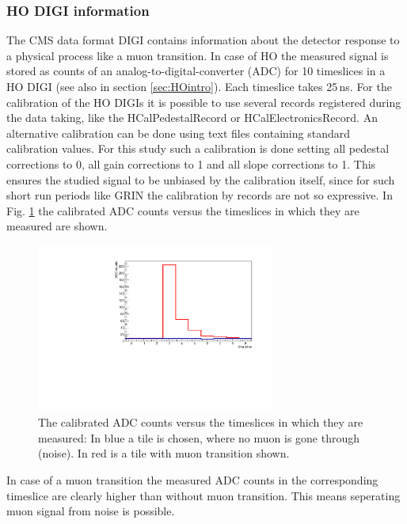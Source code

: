 		\subsubsection{HO DIGI information}
			The CMS data format DIGI contains information about the detector response to a physical process like a muon transition.
			In case of HO the measured signal is stored as counts of an analog-to-digital-converter (ADC) for 10 timeslices in a HO DIGI (see also in section \ref{sec:HOintro}).
			Each timeslice takes 25\,ns.
			For the calibration of the HO DIGIs it is possible to use several records registered during the data taking, like the HCalPedestalRecord or HCalElectronicsRecord.
			An alternative calibration can be done using text files containing standard calibration values.
			For this study such a calibration is done setting all pedestal corrections to 0, all gain corrections to 1 and all slope corrections to 1.
			This ensures the studied signal to be unbiased by the calibration itself, since for such short run periods like GRIN the calibration by records are not so expressive.
			In Fig. \ref{fig:adc_vs_ts} the calibrated ADC counts versus the timeslices in which they are measured are shown.
			\begin{figure}[htbp]
				\centering
				\includegraphics[width=0.70\textwidth]{Figures/erdogan/adc_vs_ts.pdf}
				\caption{The calibrated ADC counts versus the timeslices in which they are measured: In blue a tile is chosen, where no muon is gone through (noise). In red is a tile with muon transition shown.}
				\label{fig:adc_vs_ts}
			\end{figure}
			In case of a muon transition the measured ADC counts in the corresponding timeslice are clearly higher than without muon transition.
			This means seperating muon signal from noise is possible.
